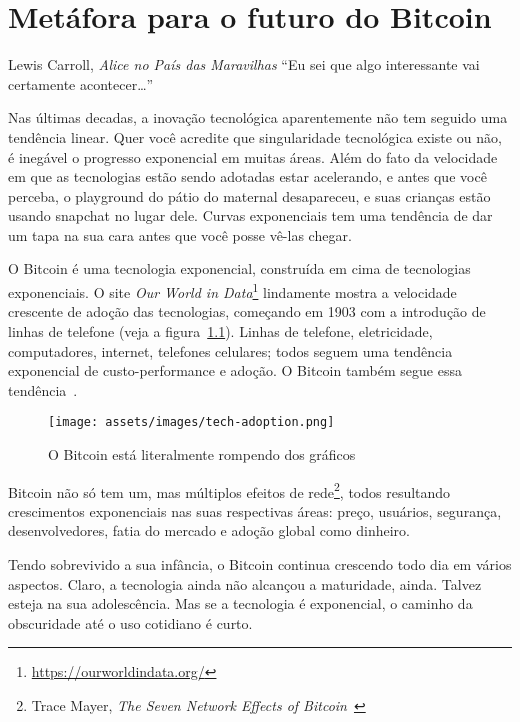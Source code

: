\chapter{Metáfora para o futuro do Bitcoin}
\label{les:21}

\begin{chapquote}{Lewis Carroll, \textit{Alice no País das Maravilhas}}
\enquote{Eu sei que algo interessante vai certamente acontecer\ldots}
\end{chapquote}

Nas últimas decadas, a inovação tecnológica aparentemente não tem seguido 
uma tendência linear. Quer você acredite que singularidade tecnológica existe 
ou não, é inegável o progresso exponencial em muitas áreas. Além do fato da velocidade 
em que as tecnologias estão sendo adotadas estar acelerando, e antes 
que você perceba, o playground do pátio do maternal desapareceu, e suas 
crianças estão usando snapchat no lugar dele. Curvas exponenciais tem uma 
tendência de dar um tapa na sua cara antes que você posse vê-las chegar.

O Bitcoin é uma tecnologia exponencial, construída em cima de tecnologias exponenciais.
O site \textit{Our World in Data}\footnote{\url{https://ourworldindata.org/}}
lindamente mostra a velocidade crescente de adoção das tecnologias, começando em 1903
com a introdução de linhas de telefone (veja a figura~\ref{fig:tech-adoption}).
Linhas de telefone, eletricidade, computadores, internet, telefones celulares; 
todos seguem uma tendência exponencial de custo-performance e adoção. 
O Bitcoin também segue essa tendência~\cite{tech-adoption}.

\begin{figure}
  \texttt{[image: assets/images/tech-adoption.png]}
  \caption{O Bitcoin está literalmente rompendo dos gráficos}
  \label{fig:tech-adoption}
\end{figure}

Bitcoin não só tem um, mas múltiplos efeitos de rede\footnote{Trace Mayer,
  \textit{The Seven Network Effects of Bitcoin}~\cite{7-network-effects}}, todos
resultando crescimentos exponenciais nas suas respectivas áreas: preço, usuários, 
segurança, desenvolvedores, fatia do mercado e adoção global como dinheiro.

Tendo sobrevivido a sua infância, o Bitcoin continua crescendo todo dia em vários aspectos.
Claro, a tecnologia ainda não alcançou a maturidade, ainda. Talvez esteja na sua 
adolescência. Mas se a tecnologia é exponencial, o caminho da obscuridade até 
o uso cotidiano é curto. 


